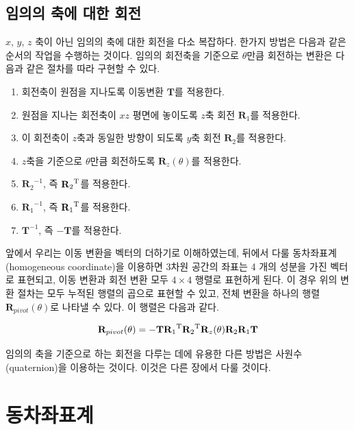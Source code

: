 \subsection{임의의 축에 대한 회전}

$x$, $y$, $z$ 축이 아닌 임의의 축에 대한 회전을 다소 복잡하다.
한가지 방법은 다음과 같은 순서의 작업을 수행하는 것이다.
임의의 회전축을 기준으로  $\theta$만큼 회전하는 변환은 다음과 같은 절차를 따라 구현할 수 있다.

\begin{enumerate}
\item 회전축이 원점을 지나도록 이동변환 $\mathbf T$를 적용한다.
\item 원점을 지나는 회전축이 $xz$ 평면에 놓이도록 $z$축 회전 $\mathbf R_1$를 적용한다.
\item 이 회전축이 $z$축과 동일한 방향이 되도록 $y$축 회전 $\mathbf R_2$를 적용한다.
\item $z$축을 기준으로 $\theta$만큼 회전하도록 $\mathbf R_z(\theta)$를 적용한다.
\item ${\mathbf R_2}^{-1}$, 즉 ${\mathbf R_2}^{\rm T}$를 적용한다.
\item ${\mathbf R_1}^{-1}$, 즉 ${\mathbf R_1}^{\rm T}$를 적용한다.
\item $\mathbf T^{-1}$, 즉 $- \mathbf T$를 적용한다.
\end{enumerate}

앞에서 우리는 이동 변환을 벡터의 더하기로 이해하였는데, 뒤에서 다룰 동차좌표계(homogeneous coordinate)을 이용하면
3차원 공간의 좌표는 4 개의 성분을 가진 벡터로 표현되고, 이동 변환과 회전 변환 모두 $4 \times 4$ 행렬로 표현하게 된다.
이 경우 위의 변환 절차는 모두 누적된 행렬의 곱으로 표현할 수 있고, 전체 변환을 하나의 행렬 $\mathbf R_{pivot}(\theta)$로 나타낼 수 있다.
이 행렬은 다음과 같다.

$$\mathbf R_{pivot}(\theta) = - \mathbf T {\mathbf R_1}^{\rm T} {\mathbf R_2}^{\rm T}  \mathbf R_z(\theta) \mathbf R_2  \mathbf R_1 \mathbf T $$

임의의 축을 기준으로 하는 회전을 다루는 데에 유용한 다른 방법은 사원수(quaternion)을 이용하는 것이다. 이것은 다른 장에서 다룰 것이다.

\renewcommand\chapterillustration{Math_transform/chapterImage}

\section{동차좌표계}

